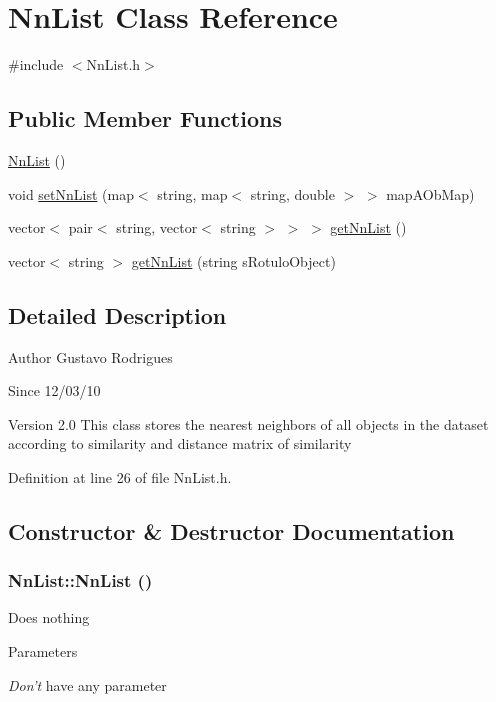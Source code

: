 \hypertarget{classNnList}{
\section{NnList Class Reference}
\label{classNnList}
}


{\ttfamily \#include $<$NnList.h$>$}\subsection*{Public Member Functions}
\begin{DoxyCompactItemize}
\item 
\hyperlink{classNnList_a097872210a6db528bced6469fd5808b4}{NnList} ()
\item 
void \hyperlink{classNnList_ac60d0c4364b888199e2629b375ca1620}{setNnList} (map$<$ string, map$<$ string, double $>$ $>$ mapAObMap)
\item 
vector$<$ pair$<$ string, vector$<$ string $>$ $>$ $>$ \hyperlink{classNnList_a1df89c57cd15312fe45435958df139ab}{getNnList} ()
\item 
vector$<$ string $>$ \hyperlink{classNnList_a7803fc91bfd3771b7e5b9b9806478dba}{getNnList} (string sRotuloObject)
\end{DoxyCompactItemize}


\subsection{Detailed Description}
\begin{DoxyAuthor}{Author}
Gustavo Rodrigues 
\end{DoxyAuthor}
\begin{DoxySince}{Since}
12/03/10 
\end{DoxySince}
\begin{DoxyVersion}{Version}
2.0 This class stores the nearest neighbors of all objects in the dataset according to similarity and distance matrix of similarity 
\end{DoxyVersion}


Definition at line 26 of file NnList.h.

\subsection{Constructor \& Destructor Documentation}
\hypertarget{classNnList_a097872210a6db528bced6469fd5808b4}{
\subsubsection[{NnList}]{\setlength{\rightskip}{0pt plus 5cm}NnList::NnList ()}}
\label{classNnList_a097872210a6db528bced6469fd5808b4}
Does nothing 
\begin{DoxyParams}{Parameters}
\item[{\em Don't}]have any parameter \end{DoxyParams}


